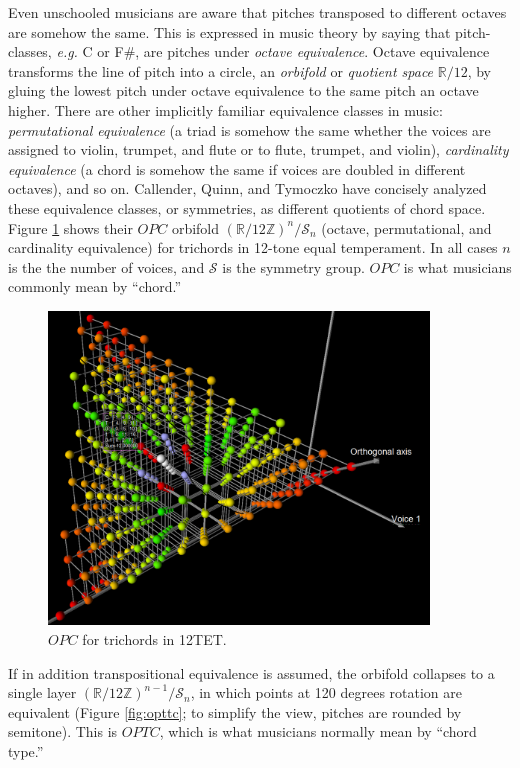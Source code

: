 \documentclass[english,11pt,letterpaper,onecolumn]{scrartcl}
\numberwithin{equation}{section}
\begin{document}
Even unschooled musicians are aware that pitches transposed to different octaves
are somehow the same. This is expressed in music theory by saying that
pitch-classes, \textit{e.g.} C or F\#, are pitches under \textit{octave
equivalence}. Octave equivalence transforms the line of pitch into a circle, an
\textit{orbifold} or \textit{quotient space} $\mathbb{R}/12$, by gluing the
lowest pitch under octave equivalence to the same pitch an octave higher. There
are other implicitly familiar equivalence classes in music:
\textit{permutational equivalence} (a triad is somehow the same whether the
voices are assigned to violin, trumpet, and flute or to flute, trumpet, and
violin), \textit{cardinality equivalence} (a chord is somehow the same if voices
are doubled in different octaves), and so on. Callender, Quinn, and Tymoczko
\cite{callender:346} have concisely analyzed these equivalence classes, or
symmetries, as different quotients of chord space. Figure \ref{fig:opc} shows
their $OPC$ orbifold $\left(\mathbb{R}/12\mathbb{Z}\right)^{n}/\mathcal{S}_{n}$
(octave, permutational, and cardinality equivalence) for trichords in 12-tone
equal temperament. In all cases $n$ is the the number of voices, and
$\mathcal{S}$ is the symmetry group. $OPC$ is what musicians commonly mean by
``chord.''

\begin{figure}
\centerline{\includegraphics[width = 0.9\textwidth]{opc}}
\caption{\label{fig:opc}
  $OPC$ for trichords in 12TET.}
\end{figure}

If in addition transpositional equivalence is assumed, the orbifold collapses to
a single layer $\left(\mathbb{R}/12\mathbb{Z}\right)^{n-1}/\mathcal{S}_{n}$, in
which points at 120 degrees rotation are equivalent (Figure \ref{fig:opttc}; to
simplify the view, pitches are rounded by semitone). This is $OPTC$, which is
what musicians normally mean by ``chord type.''
\end{document}
